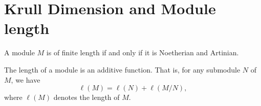 \chapter{Krull Dimension and Module length}
\label{sec:krull_dimension}


\begin{theorem}
A module $M$ is of finite length if and only if it is Noetherian and Artinian.
\end{theorem}

\begin{theorem}
The length of a module is an additive function. That is, for any submodule $N$ of $M$, we have
\[
\ell(M) = \ell(N) + \ell(M/N),
\]
where $\ell(M)$ denotes the length of $M$.
\end{theorem}
